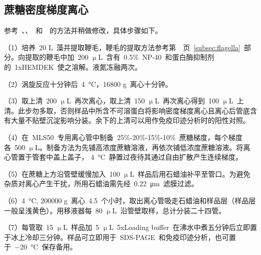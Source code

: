 \subsection{蔗糖密度梯度离心}
参考\ \citet{Fuhrmann1999}、\citet{Richey2012}、\citet{Behal2013}\ 和\ \citet{Richey2013}\ 的方法并稍做修改，具体步骤如下。

（1）培养\ 20 L\ 藻并提取鞭毛，鞭毛的提取方法参考第\ \pageref{subsec:flagella}\
页\ \ref{subsec:flagella}\ 部分。向提取的鞭毛中加\ 200 $\upmu$L\ 含有\ 0.5\%\ NP-40\ 和蛋白酶抑制剂的\ 1xHEMDEK\ 使之溶解。液氮冻融两次。

（2）涡旋反应十分钟后\ \SI{4}{\degreeCelsius}，16800 g\ 离心十分钟。

（3）取上清\ 200 $\upmu$L\ 再次离心，取上清\ 150 $\upmu$L\ 再次离心得到\ 100 $\upmu$L\ 上清。此步勿多取，否则样品中所含不可溶蛋白将影响密度梯度离心且离心后管底含有大量不贴壁沉淀影响分装。余下的上清可以用作免疫印迹分析时的阳性对照。

（4）在\ MLS50\ 专用离心管中制备\ 25\%-20\%-15\%-10\%\ 蔗糖梯度，每个梯度各\ 500 $\upmu$L。制备方法为先铺高浓度蔗糖溶液，再依次铺低浓度蔗糖溶液。将离心管置于管套中盖上盖子，
\SI{4}{\degreeCelsius}\ 静置过夜待其通过自由扩散产生连续梯度。

（5）在蔗糖上方沿管壁缓慢加入\ 100 $\upmu$L\ 样品后用石蜡油补平至管口。为避免杂质对离心产生干扰，所用石蜡油需先经\ \SI{0.22}{\um}\ 滤膜过滤。

（6）\SI{4}{\degreeCelsius}, 200000 g\ 离心\ 4.5\ 个小时，取出离心管吸走石蜡油和样品层（样品层一般呈浅黄色）。用移液器每\ 80 $\upmu$L\ 沿管壁取样，总计分装二十四管。

（7）每管取\ 15 $\upmu$L\ 样品加\ 5 $\upmu$L\ 5xLoading buffer\ 在沸水中煮五分钟后立即置于冰上冷却三分钟。样品可立即用于\ SDS-PAGE\ 和免疫印迹分析，也可置于\ \SI{-20}{\degreeCelsius}\ 保存备用。

